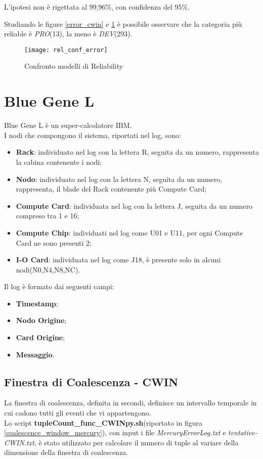 L'ipotesi non è rigettata al 99,96\%, con confidenza del 95\%.\\

\clearpage

Studiando le figure \ref{error_cwin} e \ref{rel_models} è possibile osservare
che la categoria più reliable è \textit{PRO}(13), la meno è \textit{DEV}(293).\\

\begin{figure}[!htbp]
  \centering
  \texttt{[image: rel\_conf\_error]}
  \caption{Confronto modelli di Reliability}
  \label{rel_models}
\end{figure}

\clearpage

\section{Blue Gene L}
Blue Gene L è un super-calcolatore IBM.\\
I nodi che compongono il sistema, riportati nel log, sono:
\begin{itemize}
  \item \textbf{Rack}: individuato nel log con la lettera R, seguita da un numero,
  rappresenta la cabina contenente i nodi;
  \item \textbf{Nodo}: individuato nel log con la lettera N, seguita da un numero,
  rappresenta, il blade del Rack contenente più Compute Card;
  \item \textbf{Compute Card}: individuata nel log con la lettera J, seguita da un
  numero compreso tra 1 e 16;
  \item \textbf{Compute Chip}: individuati nel log come U01 e U11, per ogni Compute
  Card ne sono presenti 2;
  \item \textbf{I-O Card}: individuata nel log come J18, è presente solo in alcuni
  nodi(N0,N4,N8,NC).
\end{itemize}

Il log è formato dai seguenti campi:
\begin{itemize}
  \item \textbf{Timestamp};
  \item \textbf{Nodo Origine};
  \item \textbf{Card Origine};
  \item \textbf{Messaggio}.
\end{itemize}

\clearpage

\subsection{Finestra di Coalescenza - CWIN}
La finestra di coalescenza, definita in secondi, definisce un intervallo temporale
in cui cadono tutti gli eventi che vi appartengono.\\
Lo script \textbf{tupleCount\_func\_CWINpy.sh}(riportato in figura \ref{coalescence_window_mercury}), con input i file \textit{MercuryErrorLog.txt}
e \textit{tentative-CWIN.txt}, è stato utilizzato per calcolare il numero di tuple al
variare della dimensione della finestra di coalescenza.\\

